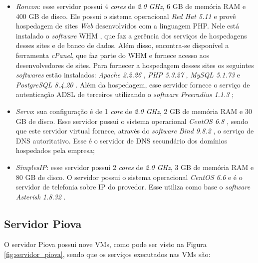 \begin{itemize}
 \item \textit{Roncon}: esse servidor possui 4 \textit{cores} de \textit{2.0 GHz}, 6 GB de memória \ac{RAM} e 400 GB de disco. 
 Ele possui o sistema operacional \textit{Red Hat 5.11} \cite{redhat} e provê hospedagem de sites \textit{Web} desenvolvidos com a linguagem 
 \ac{PHP}. Nele está instalado o \textit{software} \ac{WHM} \cite{whm}, que faz a gerência dos serviços de hospedagens desses sites e de banco de 
 dados. Além disso, encontra-se disponível a ferramenta \textit{cPanel}, que faz parte do \ac{WHM} e fornece acesso aos desenvolvedores de
 sites. Para fornecer a hospedagem desses sites os seguintes \textit{softwares} estão instalados: \textit{Apache 2.2.26} \cite{apache}, 
 \textit{\ac{PHP} 5.3.27} \cite{php}, \textit{MySQL 5.1.73} \cite{mysql} e \textit{PostgreSQL 8.4.20} \cite{postgres}.
 Além da hospedagem, esse servidor fornece o serviço de autenticação \ac{ADSL} \cite{tanenbaum2011} de terceiros utilizando o \textit{software} 
 \textit{Freeradius 1.1.3} \cite{freeradius};
 
 \item \textit{Servo}: sua configuração é de 1 \textit{core} de \textit{2.0 GHz}, 2 GB de memória \ac{RAM} e 30 GB de disco. 
 Esse servidor possui o sistema operacional \textit{CentOS 6.8} \cite{centos}, sendo que este servidor virtual fornece, através do \textit{software} 
 \textit{Bind 9.8.2} \cite{bind}, o serviço de \ac{DNS} autoritativo. Esse é o servidor de \ac{DNS} secundário dos domínios hospedados pela empresa;
 
 \item \textit{SimplesIP}: esse servidor possui 2 \textit{cores} de \textit{2.0 GHz}, 3 GB de memória \ac{RAM} e 80 GB de disco. 
 O servidor possui o sistema operacional \textit{CentOS 6.6} \cite{centos} e é o servidor de telefonia sobre \ac{IP} do provedor. Esse utiliza 
 como base o \textit{software} \textit{Asterisk 1.8.32} \cite{asterisk}.
\end{itemize}

\subsection{Servidor Piova}
\label{section:serv_piova}

O servidor Piova possui nove \ac{VM}s, como pode ser visto na Figura \ref{fig:servidor_piova}, sendo que os serviços executados nas \ac{VM}s são:

